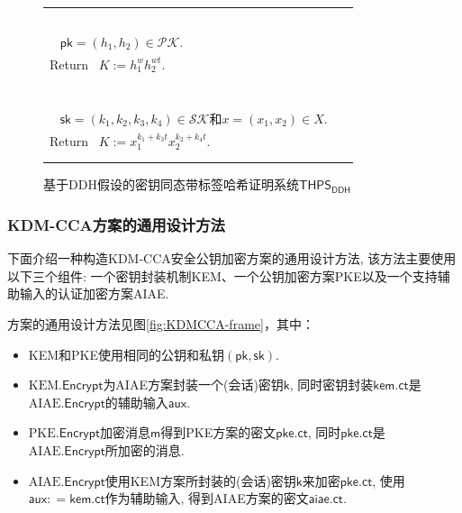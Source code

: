 {\begin{figure}[htp]
{\begin{tabular}{|l|l|}
{{\vspace{-9pt} \\
}}\\
\hline
\vspace{-11pt} \\
\makecell[l]{
\underline{$K \leftarrow \text{THPS}.\mathsf{PubEval}(\mathsf{pk}, {x}, {w}, {t})$:} \\
\vspace{-11pt} \\
~ $\mathsf{pk} = (h_1, h_2) \in \mathcal{PK}$. \\
Return~ $K := h_1^w h_2^{w t}$. \\
\vspace{-11pt} \\
}~~~~~~~    &
~\makecell[l]{
\underline{$K \leftarrow \text{THPS}.\mathsf{PrivEval}(\mathsf{sk}, {x}, {t})$:} \\
\vspace{-11pt} \\
~ $\mathsf{sk} = (k_1, k_2, k_3, k_4) \in \mathcal{SK}$和$x = (x_1, x_2) \in X$. \\
Return~ $K := x_1^{k_1 + k_3 t} x_2^{k_2 + k_4 t}$. \\
\vspace{-11pt} \\
}       \\
\hline
\end{tabular}}\caption{\label{fig:THPS-Con} 基于DDH假设的密钥同态带标签哈希证明系统$\textsf{THPS}_{\mathsf{DDH}}$}
\end{figure}}

\subsubsection{KDM-CCA方案的通用设计方法}
下面介绍一种构造KDM-CCA安全公钥加密方案的通用设计方法, 该方法主要使用以下三个组件: 
一个密钥封装机制KEM、一个公钥加密方案PKE以及一个支持辅助输入的认证加密方案AIAE.

方案的通用设计方法见图\ref{fig:KDMCCA-frame}，其中：
  \begin{itemize}
\item KEM和PKE使用相同的公钥和私钥$(\mathsf{pk}, \mathsf{sk})$.

\item $\text{KEM}.\mathsf{Encrypt}$为AIAE方案封装一个(会话)密钥$\mathsf{k}$, 同时密钥封装$\mathsf{kem.ct}$是$\text{AIAE}.\mathsf{Encrypt}$的辅助输入$\mathsf{aux}$.

\item $\text{PKE}.\mathsf{Encrypt}$加密消息$\mathsf{m}$得到PKE方案的密文$\mathsf{pke.ct}$, 同时$\mathsf{pke.ct}$是$\text{AIAE}.\mathsf{Encrypt}$所加密的消息.

\item $\text{AIAE}.\mathsf{Encrypt}$使用KEM方案所封装的(会话)密钥$\mathsf{k}$来加密$\mathsf{pke.ct}$, 使用$\mathsf{aux}: = \mathsf{kem.ct}$作为辅助输入, 得到AIAE方案的密文$\mathsf{aiae.ct}$.
\end{itemize}

